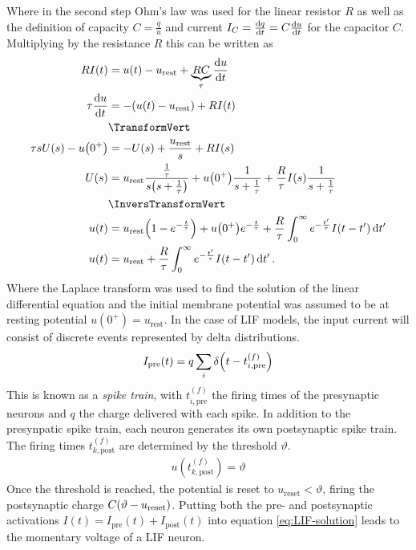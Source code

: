 Where in the second step Ohm's law was used for the linear resistor $R$ as well as the definition of capacity $C=\frac{q}{u}$ and current $I_C=\dv{q}{t}=C\dv{u}{t}$ for the capacitor $C$.\\
Multiplying by the resistance $R$ this can be written as
\begin{align}
    R I(t) &=  u(t) - u_\mathrm{rest}+\underbrace{RC}_{\tau}\dv{u}{t}\\
    \tau \dv{u}{t}&= -\qty(u(t)-u_\mathrm{rest})+RI(t)\label{eq:LIF}\\
    &\TransformVert\\
    \tau s U(s) - u\qty(0^+) &= -U(s)+\frac{u_\mathrm{rest}}{s}+R I(s)\\
    U(s) &= u_\mathrm{rest}\frac{\frac{1}{\tau}}{s\qty(s+\frac{1}{\tau})}+u\qty(0^+)\frac{1}{s+\frac{1}{\tau}}+\frac{R}{\tau}I(s) \frac{1}{s+\frac{1}{\tau}}\\
    &\InversTransformVert\\
    u(t) &= u_\mathrm{rest}\qty(1-e^{-\frac{t}{\tau}})+u\qty(0^+)e^{-\frac{t}{\tau}}+\frac{R}{\tau}\int_0^\infty e^{-\frac{t'}{\tau}}I(t-t')\dd{t'}\\
    u(t)&=u_\mathrm{rest}+\frac{R}{\tau}\int_0^\infty e^{-\frac{t'}{\tau}}I(t-t')\dd{t'}\label{eq:LIF-solution}.
\end{align}
Where the Laplace transform was used to find the solution of the linear differential equation and the initial membrane potential was assumed to be at resting potential $u(0^+)=u_\mathrm{rest}$. In the case of LIF models, the input current will consist of discrete events represented by delta distributions.
\begin{align}
    I_\mathrm{pre}(t) = q\sum_i \delta\qty(t-t_{i,\mathrm{pre}}^{(f)})
\end{align}
This is known as a \emph{spike train}, with $t_{i,\mathrm{pre}}^{(f)}$ the firing times of the presynaptic neurons and $q$ the charge delivered with each spike. In addition to the presynpatic spike train, each neuron generates its own postsynaptic spike train. The firing times $t_{k,\mathrm{post}}^{(f)}$ are determined by the threshold $\vartheta$.
\begin{align}
    u(t_{k,\mathrm{post}}^{(f)})=\vartheta
\end{align}
Once the threshold is reached, the potential is reset to $u_\mathrm{reset} < \vartheta$, firing the postsynaptic charge $C\qty(\vartheta-u_\mathrm{reset})$. Putting both the pre- and postsynaptic activations $I(t)=I_\mathrm{pre}(t)+I_\mathrm{post}(t)$ into equation \ref{eq:LIF-solution} leads to the momentary voltage of a LIF neuron.
